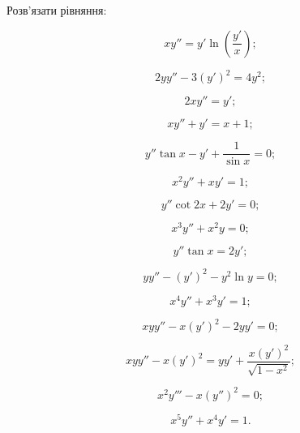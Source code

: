 Розв'язати рівняння:
\begin{multicols}{2}
    \begin{problem}
    	\[x  y'' = y'  \ln\left(\frac{y'}{x}\right);\]
    \end{problem}
 
    \begin{problem}
    	\[ 2 y  y'' - 3 (y')^2 = 4 y^2;\]
    \end{problem}
 
    \begin{problem}
    	\[2x  y'' = y';\]
    \end{problem}
 
    \begin{problem}
    	\[x  y'' + y' = x + 1;\]
    \end{problem}
 
    \begin{problem}
    	\[y'' \tan x - y' + \frac{1}{\sin x}=0;\]
    \end{problem}
 
    \begin{problem}
    	\[x^2 y''+x y'=1;\]
    \end{problem}
 
    \begin{problem}
    	\[y''  \cot 2x + 2y' = 0;\]
    \end{problem}
 
    \begin{problem}
    	\[x^3  y'' + x^2  y = 0;\]
    \end{problem}
 
    \begin{problem}
    	\[y'' \tan x = 2 y';\]
    \end{problem}
 
    \begin{problem}
    	\[y  y'' - (y')^2 - y^2  \ln y = 0;\]
    \end{problem}
 
    \begin{problem}
    	\[x^4 y''+x^3 y'=1;\]
    \end{problem}
 
    \begin{problem}
    	\[x y y''-x  (y')^2 - 2 y  y' = 0;\]
    \end{problem}
 
    \begin{problem}
    	\[x y y''-x  (y')^2 = y  y'+\frac{x  (y')^2}{\sqrt{1-x^2}};\]
    \end{problem}
 
    \begin{problem}
    	\[x^2 y'''-x  (y'')^2=0;\]
    \end{problem}
 
    \begin{problem}
    	\[x^5 y''+x^4  y'=1.\]
    \end{problem}
\end{multicols}